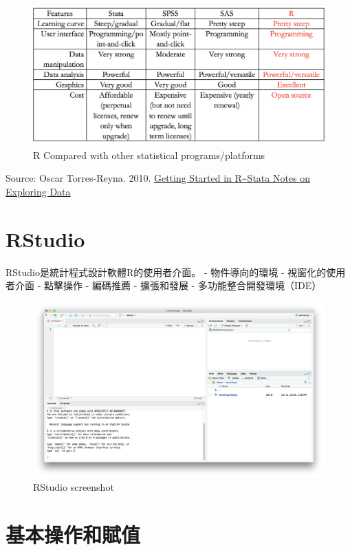 \documentclass[]{book}
\begin{document}
\begin{figure}
\includegraphics[width=1\linewidth]{Rcompare} \caption{R Compared with other statistical programs/platforms}\label{fig:Rcompare}
\end{figure}

Source: Oscar Torres-Reyna. 2010. \href{https://dss.princeton.edu/training/RStata.pdf}{Getting Started in R\textasciitilde Stata Notes on Exploring Data}

\hypertarget{rstudio}{%
\section{RStudio}\label{rstudio}}

RStudio是統計程式設計軟體R的使用者介面。
- 物件導向的環境
- 視窗化的使用者介面
- 點擊操作
- 編碼推薦
- 擴張和發展
- 多功能整合開發環境（IDE）

\begin{figure}
\includegraphics[width=1\linewidth]{RStudioscreenshot} \caption{RStudio screenshot}\label{fig:Rstudioscreenshot}
\end{figure}

\hypertarget{section-3}{%
\section{基本操作和賦值}\label{section-3}}
\end{document}
